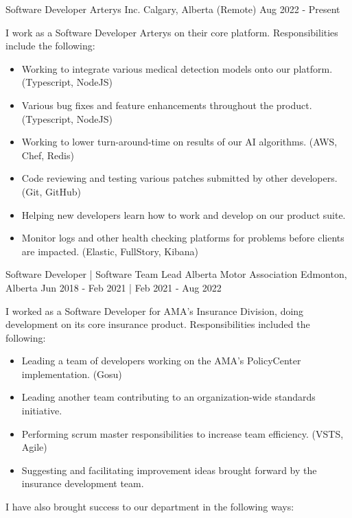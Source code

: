 
\begin{cventries}
    \cventry
        {Software Developer}
        {Arterys Inc.}
        {Calgary, Alberta (Remote)}
        {Aug 2022 - Present}
        {
            I work as a Software Developer Arterys on their core platform.  Responsibilities include the following:
            \begin{itemize}
                \item Working to integrate various medical detection models onto our platform. (Typescript, NodeJS)
                \item Various bug fixes and feature enhancements throughout the product. (Typescript, NodeJS)
                \item Working to lower turn-around-time on results of our AI algorithms. (AWS, Chef, Redis)
                \item Code reviewing and testing various patches submitted by other developers. (Git, GitHub)
                \item Helping new developers learn how to work and develop on our product suite. 
                \item Monitor logs and other health checking platforms for problems before clients are impacted. (Elastic, FullStory, Kibana)
            \end{itemize}
        }
    \cventry
        {Software Developer | Software Team Lead}
        {Alberta Motor Association}
        {Edmonton, Alberta}
        {Jun 2018 - Feb 2021 | Feb 2021 - Aug 2022}
        {
            I worked as a Software Developer for AMA’s Insurance Division, doing development on its core insurance product.  Responsibilities included the following:
            \begin{itemize}
                \item Leading a team of developers working on the AMA's PolicyCenter implementation. (Gosu)
                \item Leading another team contributing to an organization-wide standards initiative. 
                \item Performing scrum master responsibilities to increase team efficiency. (VSTS, Agile)
                \item Suggesting and facilitating improvement ideas brought forward by the insurance development team.
            \end{itemize}
            I have also brought success to our department in the following ways:
}
\end{cventries}
